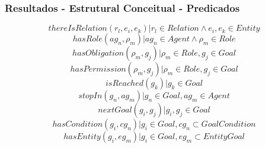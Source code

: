 \documentclass{beamer}
\begin{document}
\begin{frame}
	\frametitle{Resultados - Estrutural Conceitual - Predicados}
	\begin{equation}
		thereIsRelation(r_l,e_i,e_k) | r_l \in Relation \wedge  e_i, e_k \in Entity
	\end{equation}
	\begin{equation}	
		hasRole(ag_n,\rho_m) | ag_n \in Agent \wedge \rho_m \in Role 	
	\end{equation}
	\begin{equation}	
		hasObligation(\rho_m,g_j) | \rho_m \in Role, g_j \in Goal 
	\end{equation}		
	\begin{equation}	
		hasPermission(\rho_m, g_j) | \rho_m \in Role, g_j \in Goal
	\end{equation}
	\begin{equation}		
		isReached(g_k) | g_k \in Goal 
	\end{equation}
	\begin{equation}			
		stopIn(g_n, ag_m) | g_n \in Goal, ag_m \in Agent
	\end{equation}
	\begin{equation}			
		nextGoal(g_i,g_j) |g_i, g_j \in Goal
	\end{equation}
	\begin{equation}				
		hasCondition(g_i,cg_n) | g_i \in Goal, cg_n \subset GoalCondition
	\end{equation}
	\begin{equation}				
		hasEntity(g_i,eg_m) | g_i \in Goal, eg_m \subset EntityGoal 
	\end{equation}

\end{frame}
\end{document}

